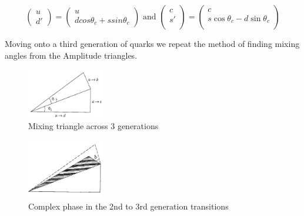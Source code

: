 \[\left( \begin{array}{c}
 u \\ d'
 \end{array} \right)  = 
\left( \begin{array}{c}
 u \\ dcos\theta_c +ssin\theta_c
 \end{array} \right) \mbox{ and }
 \left( \begin{array}{c}
 c \\ s' \\
 \end{array} \right)  =
 \left( \begin{array}
{c} c \\
 s\cos\theta_c -d \sin\theta_c \\
 \end{array}
\right)
\]

Moving onto a third generation of quarks we repeat the method of finding mixing angles from the Amplitude triangles.

\begin{figure}[h]
\includegraphics[width=0.3\textwidth]{figs/ckmfig4a.jpg}
\caption{Mixing triangle across 3 generations}
\label{tri3}
\end{figure}
\begin{figure}[h]
\includegraphics[width=0.3\textwidth]{figs/ckmfig4b.jpg}
\caption{Complex phase in the 2nd to 3rd generation transitions}
\label{tri4}
\end{figure}

